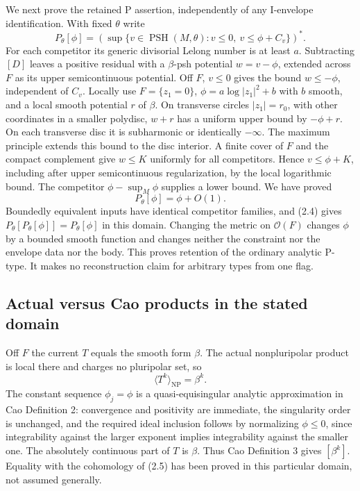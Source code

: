 \documentclass[11pt]{article}
\newcommand{\PSH}{\operatorname{PSH}}
\newcommand{\NP}{\mathrm{NP}}
\begin{document}
We next prove the retained P assertion, independently of any I-envelope identification. With fixed $\theta$ write
\[
 P_\theta[\phi]=\left(\sup\{v\in\PSH(M,\theta):v\leq0,
                  \ v\leq\phi+C_v\}\right)^*.
\]
For each competitor its generic divisorial Lelong number is at least $a$. Subtracting $[D]$ leaves a positive residual with a $\beta$-psh potential $w=v-\phi$, extended across $F$ as its upper semicontinuous potential. Off $F$, $v\leq0$ gives the bound $w\leq-\phi$, independent of $C_v$. Locally use $F=\{z_1=0\}$, $\phi=a\log|z_1|^2+b$ with $b$ smooth, and a local smooth potential $r$ of $\beta$. On transverse circles $|z_1|=r_0$, with other coordinates in a smaller polydisc, $w+r$ has a uniform upper bound by $-\phi+r$. On each transverse disc it is subharmonic or identically $-\infty$. The maximum principle extends this bound to the disc interior. A finite cover of $F$ and the compact complement give $w\leq K$ uniformly for all competitors. Hence $v\leq\phi+K$, including after upper semicontinuous regularization, by the local logarithmic bound. The competitor $\phi-\sup_M\phi$ supplies a lower bound. We have proved
\[
                 P_\theta[\phi]=\phi+O(1). \tag{2.4}
\]
Boundedly equivalent inputs have identical competitor families, and (2.4) gives $P_\theta[P_\theta[\phi]]=P_\theta[\phi]$ in this domain. Changing the metric on $\mathcal O(F)$ changes $\phi$ by a bounded smooth function and changes neither the constraint nor the envelope data nor the body. This proves retention of the ordinary analytic P-type. It makes no reconstruction claim for arbitrary types from one flag.

\subsection{Actual versus Cao products in the stated domain}
Off $F$ the current $T$ equals the smooth form $\beta$. The actual nonpluripolar product is local there and charges no pluripolar set, so
\[
                    \langle T^k\rangle_{\NP}=\beta^k. \tag{2.5}
\]
The constant sequence $\phi_j=\phi$ is a quasi-equisingular analytic approximation in Cao Definition 2: convergence and positivity are immediate, the singularity order is unchanged, and the required ideal inclusion follows by normalizing $\phi\leq0$, since integrability against the larger exponent implies integrability against the smaller one. The absolutely continuous part of $T$ is $\beta$. Thus Cao Definition 3 gives $[\beta^k]$. Equality with the cohomology of (2.5) has been proved in this particular domain, not assumed generally.
\end{document}
